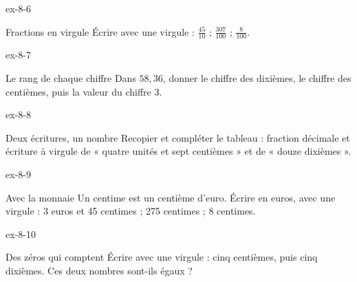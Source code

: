 \begin{blocLivre}{ex-8-6}\begin{exercice}[2]{Fractions en virgule}
Écrire avec une virgule : $\frac{45}{10}$ ; $\frac{307}{100}$ ; $\frac8{100}$.
\end{exercice}\end{blocLivre}
\begin{blocLivre}{ex-8-7}\begin{exercice}[2]{Le rang de chaque chiffre}
Dans $58{,}36$, donner le chiffre des dixièmes, le chiffre des centièmes, puis la valeur du chiffre 3.
\end{exercice}\end{blocLivre}
\begin{blocLivre}{ex-8-8}\begin{exercice}[2]{Deux écritures, un nombre}
Recopier et compléter le tableau : fraction décimale et écriture à virgule de « quatre unités et sept centièmes » et de « douze dixièmes ».
\end{exercice}\end{blocLivre}
\begin{blocLivre}{ex-8-9}\begin{exercice}[2]{Avec la monnaie}
Un centime est un centième d’euro. Écrire en euros, avec une virgule : 3 euros et 45 centimes ; 275 centimes ; 8 centimes.
\end{exercice}\end{blocLivre}
\begin{blocLivre}{ex-8-10}\begin{exercice}[2]{Des zéros qui comptent}
Écrire avec une virgule : cinq centièmes, puis cinq dixièmes. Ces deux nombres sont-ils égaux ?
\end{exercice}\end{blocLivre}

